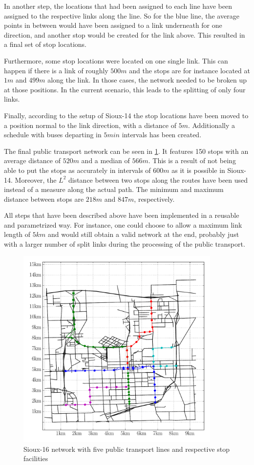 In another step, the locations that had been assigned to each line have been
assigned to the respective links along the line. So for the blue line, the average
points in between would have been assigned to a link underneath for one direction,
and another stop would be created for the link above. This resulted in a final
set of stop locations.

Furthermore, some stop locations were located on one single link. This
can happen if there is a link of roughly $500m$ and the stops are for instance
located at $1m$ and $499m$ along the link. In those cases, the network needed to
be broken up at those positions. In the current scenario, this leads to the splitting
of only four links.

Finally, according to the setup of Sioux-14 the stop locations have been moved
to a position normal to the link direction, with a distance of $5m$. Additionally
a schedule with buses departing in $5min$ intervals has been created.

The final public transport network can be seen in \cref{fig:pt_network}. It features
150 stops with an average distance of $520m$ and a median of $566m$. This is a
result of not being able to put the stops as accurately in intervals of $600m$
as it is possible in Sioux-14. Moreover, the $L^2$ distance between two stops along
the routes have been used instead of a measure along the actual path. The minimum
and maximum distance between stops are $218m$ and $847m$, respectively.

All steps that have been described above have been implemented in a reusable and
parametrized way. For instance, one could choose to allow a maximum link length of
$5km$ and would still obtain a valid network at the end, probably just with a larger
number of split links during the processing of the public transport.

\begin{figure}
    \centering
    \includegraphics[width=0.9\textwidth]{figures/pt_network.pdf}
    \caption{Sioux-16 network with five public transport lines and respective stop
    facilities}
    \label{fig:pt_network}
\end{figure}

